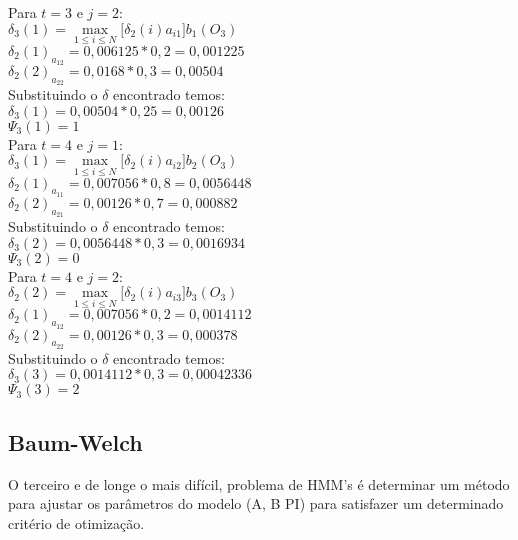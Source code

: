 \begin{multicols}{2}
Para $t=3$ e $j = 2$:\\
$\displaystyle \delta_3 (1) = \max\limits_{1 \leq i \leq N} \Big[\delta_{2}(i) a_{i1} \Big]b_1 (O_3)$\\
$\delta_2(1)_{a_{12}} = 0,006125 * 0,2 = 0,001225$\\
$\delta_2(2)_{a_{22}} = 0,0168 * 0,3 = 0,00504$\\ 


Substituindo o $\delta$ encontrado temos:\\
$\delta_3(1) = 0,00504 * 0,25 = 0,00126$\\ 
 $\Psi_3(1) = 1$\\

Para $t=4$ e $j = 1$:\\
$\displaystyle \delta_3 (1) = \max\limits_{1 \leq i \leq N} \Big[\delta_{2}(i) a_{i2} \Big]b_2 (O_3)$\\
$\delta_2(1)_{a_{11}} = 0,007056 * 0,8 = 0,0056448$\\
$\delta_2(2)_{a_{21}} = 0,00126 * 0,7 = 0,000882$\\
 
Substituindo o $\delta$ encontrado temos:\\
 $\delta_3(2) = 0,0056448 * 0,3 = 0,0016934$\\
$\Psi_3(2) = 0$\\

Para $t=4$ e $j = 2$:\\
$\displaystyle \delta_2 (2) = \max\limits_{1 \leq i \leq N} \Big[\delta_{2}(i) a_{i3} \Big]b_3 (O_3)$\\
$\delta_2(1)_{a_{12}} = 0,007056 * 0,2 = 0,0014112$\\
$\delta_2(2)_{a_{22}} = 0,00126 * 0,3 = 0,000378$\\ 


 Substituindo o $\delta$ encontrado temos:\\
$\delta_3(3) = 0,0014112 * 0,3 = 0,00042336$\\
$\Psi_3(3) = 2$\\

\end{multicols}




\subsection{Baum-Welch}
\label{secBW}
O terceiro e de longe o mais difícil, problema de HMM's é determinar um método para ajustar os parâmetros do modelo (A, B PI) para satisfazer um determinado critério de otimização.

